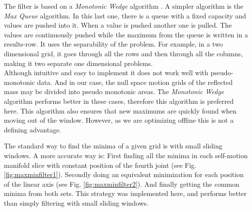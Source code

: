 The filter is based on a \textit{Monotonic Wedge} algorithm \cite{Lemire}.
A simpler algorithm is the \textit{Max Queue} algorithm. In this last one, there is a queue with a fixed capacity and values are pushed into it. When a value is pushed another one is pulled. The values are continuously pushed while the maximum from the queue is written in a results-row.
It uses the separability of the problem.  For example, in a two dimensional grid, it goes through all the rows and then through all the columns, making it two separate one dimensional problems.\\
%
Although intuitive and easy to implement it does not work well with pseudo-monotonic data. And in our case, the null space motion grids of the reflected mass may be divided into pseudo monotonic areas. The \textit{Monotonic Wedge} algorithm performs better in these cases, therefore this algorithm is preferred here. This algorithm also ensures that new maximums are quickly found when moving out of the window. However, as we are optimizing offline this is not a defining advantage.






The standard way to find the minima of a given grid is with small sliding windows. A more accurate way is: First finding all the minima in each self-motion manifold slice with constant position of the fourth joint (see Fig. \ref{fig:maxminfilter1}). Secondly doing an equivalent minimization for each position of the linear axis (see Fig. \ref{fig:maxminfilter2}). 
And finally getting the common minima from both sets. This strategy was implemented here, and performs better than simply filtering with small sliding windows. 


